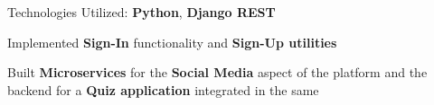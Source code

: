 \documentclass[]{deedy-resume-openfont}
\begin{document}
\begin{minipage}[t]{0.66\textwidth}
\begin{tightemize}
\item Technologies Utilized: \textbf{Python}, \textbf{Django REST}
\item Implemented \textbf{Sign-In} functionality and \textbf{Sign-Up utilities}
\item Built \textbf{Microservices} for the \textbf{Social Media} aspect of the platform and the backend for a \textbf{Quiz application} integrated in the same
\end{tightemize}
\sectionsep
\sectionsep






\end{minipage}
\end{document}
